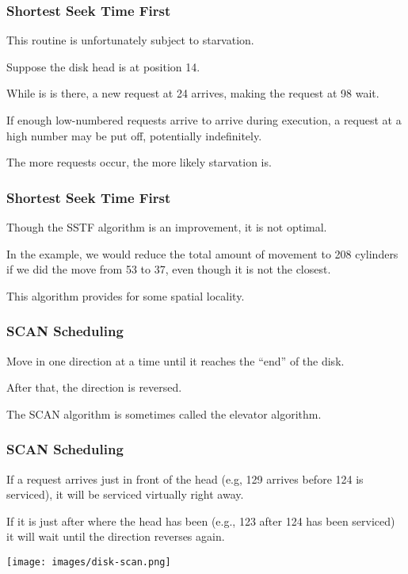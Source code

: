 \begin{frame}
\frametitle{Shortest Seek Time First}

This routine is unfortunately subject to starvation. 

Suppose the disk head is at position 14. 

While is is there, a new request at 24 arrives, making the request at 98 wait. 

If enough low-numbered requests arrive to arrive during execution, a request at a high number may be put off, potentially indefinitely. 

The more requests occur, the more likely starvation is.

\end{frame}

\begin{frame}
\frametitle{Shortest Seek Time First}

Though the SSTF algorithm is an improvement, it is not optimal. 

In the example, we would reduce the total amount of movement to 208 cylinders if we did the move from 53 to 37, even though it is not the closest.

This algorithm provides for some spatial locality.

\end{frame}

\begin{frame}
\frametitle{SCAN Scheduling}

Move in one direction at a time until it reaches the ``end'' of the disk. 

After that, the direction is reversed. 

The SCAN algorithm is sometimes called the elevator algorithm.
\end{frame}

\begin{frame}
\frametitle{SCAN Scheduling}

If a request arrives just in front of the head (e.g, 129 arrives before 124 is serviced), it will be serviced virtually right away.

If it is just after where the head has been (e.g., 123 after 124 has been serviced) it will wait until the direction reverses again. 

\begin{center}
	\texttt{[image: images/disk-scan.png]}
\end{center}


\end{frame}

